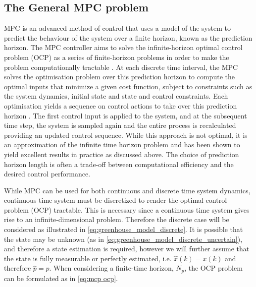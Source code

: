 \subsection {The General MPC problem}\label{ssection:general-mpc}
MPC is an advanced method of control that uses a model of the system to predict the behaviour of the system over a finite horizon, known as the prediction horizon. The MPC controller  aims to solve the infinite-horizon optimal control problem (OCP) as a series of finite-horizon problems in order to make the problem computationally tractable \cite{beckenbachAddressingInfinitehorizonOptimization2018}. At each discrete time interval, the MPC solves the optimisation problem over this prediction horizon to compute the optimal inputs that minimize a given cost function, subject to constraints such as the system dynamics, initial state and state and control constraints. Each optimisation yields a sequence on control actions to take over this prediction horizon . The first control input is applied to the system, and at the subsequent time step, the system is sampled again and the entire process is recalculated providing an updated control sequence. While this approach is not optimal, it is an approximation of the infinite time horizon problem and has been shown to yield excellent results in practice as discussed above. The choice of prediction horizon length is often a trade-off between computational efficiency and the desired control performance. 

While MPC can be used for both continuous and discrete time system dynamics,  continuous time system must be discretized to render the optimal control problem (OCP) tractable. This is necessary since a continuous time system gives rise to an infinite-dimensional problem. Therefore the discrete case will be considered as illustrated in \autoref{eq:greenhouse_model_discrete}.
It is possible that the state may be unknown (as in \autoref{eq:greenhouse_model_discrete_uncertain}), and therefore a state estimation is required, however we will further assume that the state is fully measurable or perfectly estimated, i.e. $\hat x(k) = x(k)$ and therefore $\hat{p} = p$. When considering a finite-time horizon, $N_p$, the OCP problem can be formulated as in \autoref{eq:mcp ocp}.

